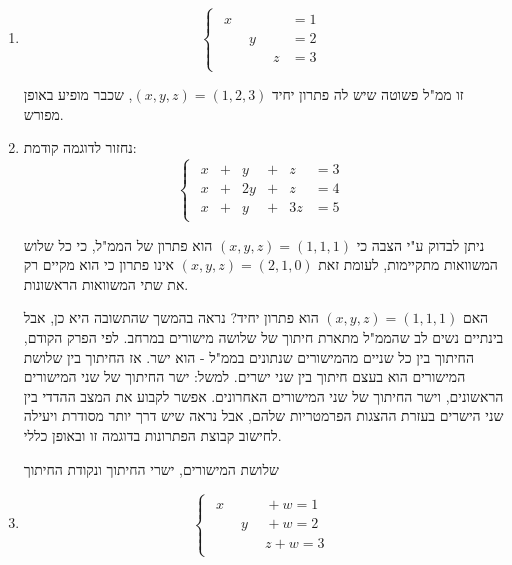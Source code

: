 \documentclass[
  hebrew,
  12pt,
  a4paper,
  oneside]{book}
\theoremstyle{definition}
\theoremstyle{remark}
\theoremstyle{plain}
\theoremstyle{remark}
\begin{document}
\begin{example}

~

\begin{enumerate}
\def\labelenumi{\arabic{enumi}.}
\item
  \[\begin{cases}
  \begin{aligned}
  x\phantom{+y+z} &= 1 \\[4pt]
  \phantom{x+}y\phantom{+z} &= 2 \\[4pt]
  \phantom{x+y+}z &= 3
  \end{aligned}
  \end{cases}\]

  זו ממ"ל פשוטה שיש לה פתרון יחיד \((x,y,z)=(1,2,3)\), שכבר מופיע באופן
  מפורש.
\item
  נחזור לדוגמה קודמת: \[\begin{cases}
  \begin{alignedat}{7}
  x &{}+{}&  y &{}+{}&  z &= 3 \\[4pt]
  x &{}+{}& 2y &{}+{}&  z &= 4 \\[4pt]
  x &{}+{}&  y &{}+{}& 3z &= 5
  \end{alignedat}
  \end{cases}\]

  ניתן לבדוק ע"י הצבה כי \((x,y,z)=(1,1,1)\) הוא פתרון של הממ"ל, כי כל
  שלוש המשוואות מתקיימות, לעומת זאת \((x,y,z)=(2,1,0)\) אינו פתרון כי
  הוא מקיים רק את שתי המשוואות הראשונות.

  האם \((x,y,z)=(1,1,1)\) הוא פתרון יחיד? נראה בהמשך שהתשובה היא כן, אבל
  בינתיים נשים לב שהממ"ל מתארת חיתוך של שלושה מישורים במרחב. לפי הפרק
  הקודם, החיתוך בין כל שניים מהמישורים שנתונים בממ"ל - הוא ישר. אז
  החיתוך בין שלושת המישורים הוא בעצם חיתוך בין שני ישרים. למשל: ישר
  החיתוך של שני המישורים הראשונים, וישר החיתוך של שני המישורים האחרונים.
  אפשר לקבוע את המצב ההדדי בין שני הישרים בעזרת ההצגות הפרמטריות שלהם,
  אבל נראה שיש דרך יותר מסודרת ויעילה לחישוב קבוצת הפתרונות בדוגמה זו
  ובאופן כללי.

  שלושת המישורים, ישרי החיתוך ונקודת החיתוך
\item
  \[\begin{cases}
  \begin{aligned}
  x\phantom{+y+z}+w=1\\
  \phantom{x+}y\phantom{+z}+w=2\\
  \phantom{x+y+}z+w=3
  \end{aligned}
  \end{cases}\]


\end{enumerate}
\end{example}
\end{document}
